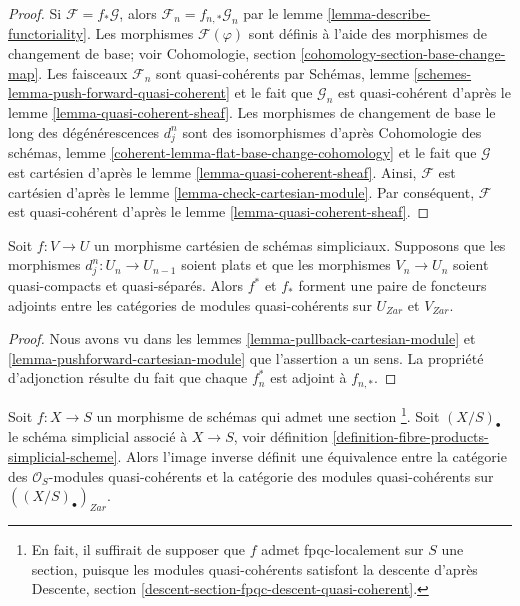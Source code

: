 \begin{proof}
Si $\mathcal{F} = f_* \mathcal{G}$, alors
$\mathcal{F}_n = f_{n , *}\mathcal{G}_n$ par
le lemme \ref{lemma-describe-functoriality}.
Les morphismes $\mathcal{F}(\varphi)$ sont définis à l'aide des morphismes de changement de base; voir
Cohomologie, section \ref{cohomology-section-base-change-map}.
Les faisceaux $\mathcal{F}_n$ sont quasi-cohérents par
Schémas, lemme \ref{schemes-lemma-push-forward-quasi-coherent}
et le fait que $\mathcal{G}_n$ est quasi-cohérent
d'après le lemme \ref{lemma-quasi-coherent-sheaf}.
Les morphismes de changement de base le long des dégénérescences
$d^n_j$ sont des isomorphismes d'après Cohomologie des schémas, lemme
\ref{coherent-lemma-flat-base-change-cohomology}
et le fait que $\mathcal{G}$ est cartésien
d'après le lemme \ref{lemma-quasi-coherent-sheaf}.
Ainsi, $\mathcal{F}$ est cartésien d'après le
lemme \ref{lemma-check-cartesian-module}.
Par conséquent, $\mathcal{F}$ est quasi-cohérent d'après le
lemme \ref{lemma-quasi-coherent-sheaf}.
\end{proof}

\begin{lemma}
\label{lemma-adjoint-functors-cartesian-modules}
Soit $f : V \to U$ un morphisme cartésien de schémas
simpliciaux. Supposons que les morphismes $d^n_j : U_n \to U_{n - 1}$ soient
plats et que les morphismes $V_n \to U_n$ soient quasi-compacts et quasi-séparés.
Alors $f^*$ et $f_*$ forment une paire de foncteurs adjoints
entre les catégories de modules quasi-cohérents sur $U_{Zar}$ et $V_{Zar}$.
\end{lemma}

\begin{proof}
Nous avons vu dans les lemmes \ref{lemma-pullback-cartesian-module} et
\ref{lemma-pushforward-cartesian-module}
que l'assertion a un sens. La propriété d'adjonction résulte
du fait que chaque $f_n^*$ est adjoint à $f_{n, *}$.
\end{proof}

\begin{lemma}
\label{lemma-cartesian-modules-with-section}
Soit $f : X \to S$ un morphisme de schémas qui admet une section
\footnote{En fait, il suffirait de supposer que $f$
admet fpqc-localement sur $S$ une section, puisque les modules quasi-cohérents
satisfont la descente d'après Descente,
section \ref{descent-section-fpqc-descent-quasi-coherent}.}.
Soit $(X/S)_\bullet$ le schéma simplicial
associé à $X \to S$, voir
définition \ref{definition-fibre-products-simplicial-scheme}.
Alors l'image inverse définit une équivalence entre la catégorie des
$\mathcal{O}_S$-modules quasi-cohérents et la catégorie des modules quasi-cohérents
sur $((X/S)_\bullet)_{Zar}$.
\end{lemma}

